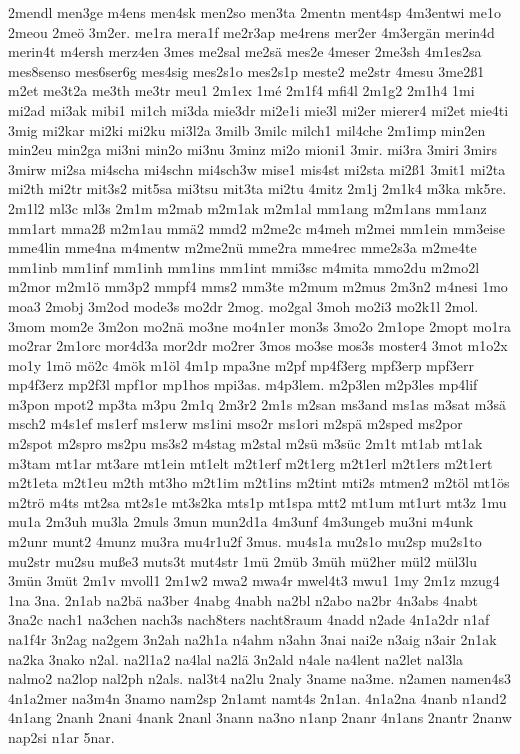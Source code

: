 {2mendl
men3ge
m4ens
men4sk
men2so
men3ta
2mentn
ment4sp
4m3entwi
me1o
2meou
2meö
3m2er.
me1ra
mera1f
me2r3ap
me4rens
mer2er
4m3ergän
merin4d
merin4t
m4ersh
merz4en
3mes
me2sal
me2sä
mes2e
4meser
2me3sh
4m1es2sa
mes8senso
mes6ser6g
mes4sig
mes2s1o
mes2s1p
meste2
me2str
4mesu
3me2ß1
m2et
me3t2a
me3th
me3tr
meu1
2m1ex
1mé
2m1f4
mfi4l
2m1g2
2m1h4
1mi
mi2ad
mi3ak
mibi1
mi1ch
mi3da
mie3dr
mi2e1i
mie3l
mi2er
mierer4
mi2et
mie4ti
3mig
mi2kar
mi2ki
mi2ku
mi3l2a
3milb
3milc
milch1
mil4che
2m1imp
min2en
min2eu
min2ga
mi3ni
min2o
mi3nu
3minz
mi2o
mioni1
3mir.
mi3ra
3miri
3mirs
3mirw
mi2sa
mi4scha
mi4schn
mi4sch3w
mise1
mis4st
mi2sta
mi2ß1
3mit1
mi2ta
mi2th
mi2tr
mit3s2
mit5sa
mi3tsu
mit3ta
mi2tu
4mitz
2m1j
2m1k4
m3ka
mk5re.
2m1l2
ml3c
ml3s
2m1m
m2mab
m2m1ak
m2m1al
mm1ang
m2m1ans
mm1anz
mm1art
mma2ß
m2m1au
mmä2
mmd2
m2me2c
m4meh
m2mei
mm1ein
mm3eise
mme4lin
mme4na
m4mentw
m2me2nü
mme2ra
mme4rec
mme2s3a
m2me4te
mm1inb
mm1inf
mm1inh
mm1ins
mm1int
mmi3sc
m4mita
mmo2du
m2mo2l
m2mor
m2m1ö
mm3p2
mmpf4
mms2
mm3te
m2mum
m2mus
2m3n2
m4nesi
1mo
moa3
2mobj
3m2od
mode3s
mo2dr
2mog.
mo2gal
3moh
mo2i3
mo2k1l
2mol.
3mom
mom2e
3m2on
mo2nä
mo3ne
mo4n1er
mon3s
3mo2o
2m1ope
2mopt
mo1ra
mo2rar
2m1orc
mor4d3a
mor2dr
mo2rer
3mos
mo3se
mos3s
moster4
3mot
m1o2x
mo1y
1mö
mö2c
4mök
m1öl
4m1p
mpa3ne
m2pf
mp4f3erg
mpf3erp
mpf3err
mp4f3erz
mp2f3l
mpf1or
mp1hos
mpi3as.
m4p3lem.
m2p3len
m2p3les
mp4lif
m3pon
mpot2
mp3ta
m3pu
2m1q
2m3r2
2m1s
m2san
ms3and
ms1as
m3sat
m3sä
msch2
m4s1ef
ms1erf
ms1erw
ms1ini
mso2r
ms1ori
m2spä
m2sped
ms2por
m2spot
m2spro
ms2pu
ms3s2
m4stag
m2stal
m2sü
m3süc
2m1t
mt1ab
mt1ak
m3tam
mt1ar
mt3are
mt1ein
mt1elt
m2t1erf
m2t1erg
m2t1erl
m2t1ers
m2t1ert
m2t1eta
m2t1eu
m2th
mt3ho
m2t1im
m2t1ins
m2tint
mti2s
mtmen2
m2töl
mt1ös
m2trö
m4ts
mt2sa
mt2s1e
mt3s2ka
mts1p
mt1spa
mtt2
mt1um
mt1urt
mt3z
1mu
mu1a
2m3uh
mu3la
2muls
3mun
mun2d1a
4m3unf
4m3ungeb
mu3ni
m4unk
m2unr
munt2
4munz
mu3ra
mu4r1u2f
3mus.
mu4s1a
mu2s1o
mu2sp
mu2s1to
mu2str
mu2su
muße3
muts3t
mut4str
1mü
2müb
3müh
mü2her
mül2
mül3lu
3mün
3müt
2m1v
mvoll1
2m1w2
mwa2
mwa4r
mwel4t3
mwu1
1my
2m1z
mzug4
1na
3na.
2n1ab
na2bä
na3ber
4nabg
4nabh
na2bl
n2abo
na2br
4n3abs
4nabt
3na2c
nach1
na3chen
nach3s
nach8ters
nacht8raum
4nadd
n2ade
4n1a2dr
n1af
na1f4r
3n2ag
na2gem
3n2ah
na2h1a
n4ahm
n3ahn
3nai
nai2e
n3aig
n3air
2n1ak
na2ka
3nako
n2al.
na2l1a2
na4lal
na2lä
3n2ald
n4ale
na4lent
na2let
nal3la
nalmo2
na2lop
nal2ph
n2als.
nal3t4
na2lu
2naly
3name
na3me.
n2amen
namen4s3
4n1a2mer
na3m4n
3namo
nam2sp
2n1amt
namt4s
2n1an.
4n1a2na
4nanb
n1and2
4n1ang
2nanh
2nani
4nank
2nanl
3nann
na3no
n1anp
2nanr
4n1ans
2nantr
2nanw
nap2si
n1ar
5nar.
}
